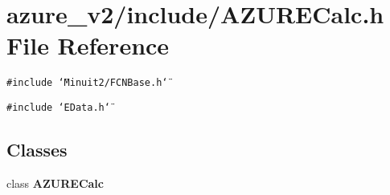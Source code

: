\section{azure\_\-v2/include/AZURECalc.h File Reference}
\label{AZURECalc_8h}
{\tt \#include \char`\"{}Minuit2/FCNBase.h\char`\"{}}\par
{\tt \#include \char`\"{}EData.h\char`\"{}}\par
\subsection*{Classes}
\begin{CompactItemize}
\item 
class \bf{AZURECalc}
\end{CompactItemize}
